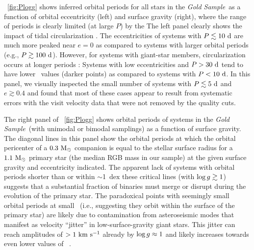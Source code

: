 \documentclass[modern]{aastex63}
\newcommand{\goldsample}{\textit{Gold Sample}}
\begin{document}
\figurename~\ref{fig:Plogg} shows inferred orbital periods for all stars in the
\goldsample\ as a function of orbital eccentricity (left) and surface gravity
(right), where the range of periods is clearly limited (at large $P$) by the
The left panel clearly shows the impact of tidal circularization
\citep[e.g.,][]{Zahn:1977, Meibom:2005}.
The eccentricities of systems with $P \lesssim 10~\mathrm{d}$ are much more peaked
near $e=0$ as compared to systems with larger orbital periods (e.g., $P\gtrsim
100~\mathrm{d}$).
However, for systems with giant-star members, circularization occurs at longer
periods \citep[e.g.,][]{Price-Whelan:2018a}: Systems with low eccentricities and
$P>30~\mathrm{d}$ tend to have lower \logg\ values (darker points) as compared to
systems with $P<10~\mathrm{d}$.
In this panel, we visually inspected the small number of systems with $P\lesssim
5~\mathrm{d}$ and $e \gtrsim 0.4$ and found that most of these cases appear to result
from systematic errors with the visit velocity data that were not removed by the
quality cuts.

The right panel of \figurename~\ref{fig:Plogg} shows orbital periods of systems
in the \goldsample\ (with unimodal or bimodal samplings) as a function of
surface gravity.
The diagonal lines in this panel show the orbital periods at which the orbital
pericenter of a $0.3~\mathrm{M}_\odot$ companion is equal to the stellar surface radius for
a $1.1~\mathrm{M}_\odot$ primary star (the median RGB mass in our sample) at the given
surface gravity and eccentricity indicated.
The apparent lack of systems with orbital periods shorter than or within
$\sim$1~$\mathrm{dex}$ these critical lines (with $\log g \gtrsim 1$) suggests
that a substantial fraction of binaries must merge or disrupt during the
evolution of the primary star.
The paradoxical points with seemingly small orbital periods at small \logg\
(i.e., suggesting they orbit within the surface of the primary star) are likely
due to contamination from asteroseismic modes that manifest as velocity
``jitter'' in low-surface-gravity giant stars.
This jitter can reach amplitudes of $>1~\mathrm{km}~\mathrm{s}^{-1}$ already by $\log g \approx 1$ and
likely increases towards even lower values of \logg\
\citep[e.g.,][]{Hekker:2008}.
\end{document}
